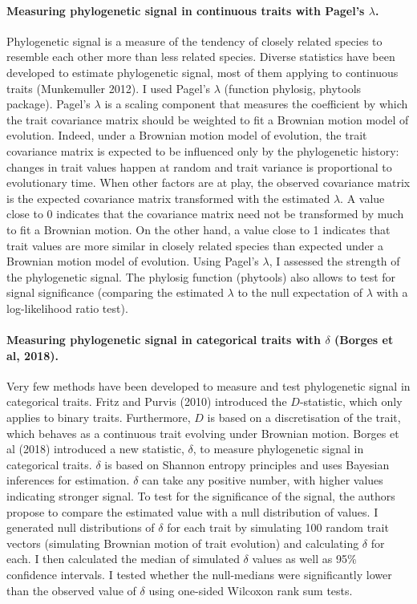 \paragraph{Measuring phylogenetic signal in continuous traits with Pagel's $\lambda$.}
Phylogenetic signal is a measure of the tendency of closely related species to resemble each other more than less related species. Diverse statistics have been developed to estimate phylogenetic signal, most of them applying to continuous traits (Munkemuller 2012). I used Pagel's $\lambda$ (function phylosig, phytools package). Pagel's $\lambda$ is a scaling component that measures the coefficient by which the trait covariance matrix should be weighted to fit a Brownian motion model of evolution. Indeed, under a Brownian motion model of evolution, the trait covariance matrix is expected to be influenced only by the phylogenetic history: changes in trait values happen at random and trait variance is proportional to evolutionary time. When other factors are at play, the observed covariance matrix is the expected covariance matrix transformed with the estimated $\lambda$. A value close to 0 indicates that the covariance matrix need not be transformed by much to fit a Brownian motion. On the other hand, a value close to 1 indicates that trait values are more similar in closely related species than expected under a Brownian motion model of evolution. Using Pagel's $\lambda$, I assessed the strength of the phylogenetic signal. The phylosig function (phytools) also allows to test for signal significance (comparing the estimated $\lambda$ to the null expectation of $\lambda$ with a log-likelihood ratio test).

\paragraph{Measuring phylogenetic signal in categorical traits with $\delta$ (Borges et al, 2018).}
Very few methods have been developed to measure and test phylogenetic signal in categorical traits. Fritz and Purvis (2010) introduced the $D$-statistic, which only applies to binary traits. Furthermore, $D$ is based on a discretisation of the trait, which behaves as a continuous trait evolving under Brownian motion. Borges et al (2018) introduced a new statistic, $\delta$, to measure phylogenetic signal in categorical traits. $\delta$ is based on Shannon entropy principles and uses Bayesian inferences for estimation. $\delta$ can take any positive number, with higher values indicating stronger signal. To test for the significance of the signal, the authors propose to compare the estimated value with a null distribution of values. I generated null distributions of $\delta$  for each trait by simulating 100 random trait vectors (simulating Brownian motion of trait evolution) and calculating $\delta$ for each. I then calculated the median of simulated $\delta$ values as well as 95\% confidence intervals. I tested whether the null-medians were significantly lower than the observed value of $\delta$ using one-sided Wilcoxon rank sum tests. 

